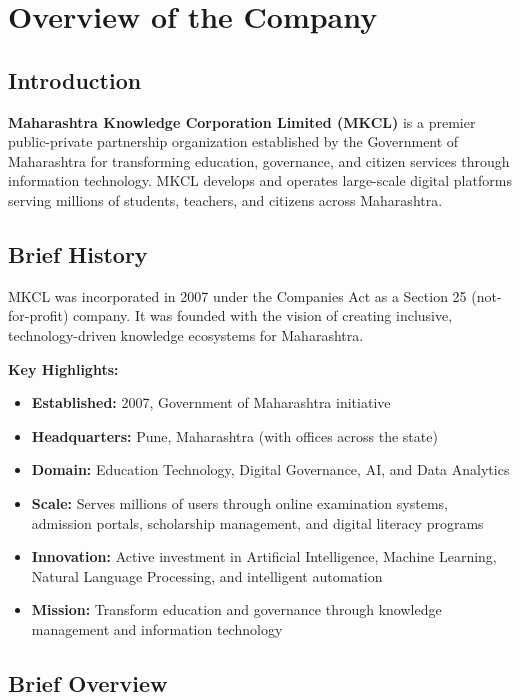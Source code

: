 \documentclass[12pt,a4paper]{report}
\begin{document}
\chapter{Overview of the Company}

\section{Introduction}

\textbf{Maharashtra Knowledge Corporation Limited (MKCL)} is a premier public-private partnership organization established by the Government of Maharashtra for transforming education, governance, and citizen services through information technology. MKCL develops and operates large-scale digital platforms serving millions of students, teachers, and citizens across Maharashtra.

\section{Brief History}

MKCL was incorporated in 2007 under the Companies Act as a Section 25 (not-for-profit) company. It was founded with the vision of creating inclusive, technology-driven knowledge ecosystems for Maharashtra.

\noindent\textbf{Key Highlights:}
\begin{itemize}[leftmargin=1.5cm]
    \item \textbf{Established:} 2007, Government of Maharashtra initiative
    \item \textbf{Headquarters:} Pune, Maharashtra (with offices across the state)
    \item \textbf{Domain:} Education Technology, Digital Governance, AI, and Data Analytics
    \item \textbf{Scale:} Serves millions of users through online examination systems, admission portals, scholarship management, and digital literacy programs
    \item \textbf{Innovation:} Active investment in Artificial Intelligence, Machine Learning, Natural Language Processing, and intelligent automation
    \item \textbf{Mission:} Transform education and governance through knowledge management and information technology
\end{itemize}

\section{Brief Overview}
\end{document}
